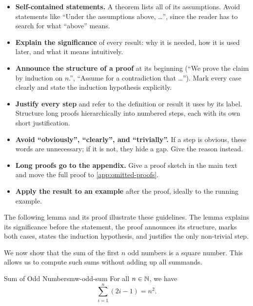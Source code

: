 \begin{itemize}
    \item \textbf{Self-contained statements.}
          A theorem lists all of its assumptions.
          Avoid statements like ``Under the assumptions above, \ldots'', since
          the reader has to search for what ``above'' means.
    \item \textbf{Explain the significance} of every result: why it is
          needed, how it is used later, and what it means intuitively.
    \item \textbf{Announce the structure of a proof} at its beginning
          (``We prove the claim by induction on $n$.'',
          ``Assume for a contradiction that \ldots'').
          Mark every case clearly and state the induction hypothesis
          explicitly.
    \item \textbf{Justify every step} and refer to the definition or result
          it uses by its label.
          Structure long proofs hierarchically into numbered steps, each with
          its own short justification.
    \item \textbf{Avoid ``obviously'', ``clearly'', and ``trivially''.}
          If a step is obvious, these words are unnecessary; if it is not, they
          hide a gap.
          Give the reason instead.
    \item \textbf{Long proofs go to the appendix.}
          Give a proof sketch in the main text and move the full proof to
          \cref{app:omitted-proofs}.
    \item \textbf{Apply the result to an example} after the proof, ideally
          to the running example.
\end{itemize}

The following lemma and its proof illustrate these guidelines.
The lemma explains its significance before the statement, the proof
announces its structure, marks both cases, states the induction hypothesis,
and justifies the only non-trivial step.

We now show that the sum of the first $n$ odd numbers is a square number.
This allows us to compute such sums without adding up all summands.

\begin{Lemma}{Sum of Odd Numbers}{mw-odd-sum}
    For all $n \in \mathbb{N}$, we have
    \begin{equation}\label{eq:mw-odd-sum}
        \sum_{i=1}^{n} (2i - 1) = n^2.
    \end{equation}
\end{Lemma}

